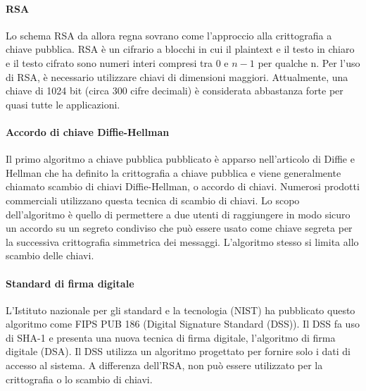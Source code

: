 \paragraph{RSA} Lo schema RSA da allora regna sovrano come l'approccio alla crittografia a chiave pubblica. RSA è un cifrario a blocchi in cui il plaintext e il testo in chiaro e il testo cifrato sono numeri interi compresi tra 0 e $n - 1$ per qualche n. Per l'uso di RSA, è necessario utilizzare chiavi di dimensioni maggiori. Attualmente, una chiave di 1024 bit (circa 300 cifre decimali) è considerata abbastanza forte per quasi tutte le applicazioni.

\singlespacing

\paragraph{Accordo di chiave Diffie-Hellman} Il primo algoritmo a chiave pubblica pubblicato è apparso nell'articolo di Diffie e Hellman che ha definito la crittografia a chiave pubblica e viene generalmente chiamato scambio di chiavi Diffie-Hellman, o accordo di chiavi. Numerosi prodotti commerciali utilizzano questa tecnica di scambio di chiavi. Lo scopo dell'algoritmo è quello di permettere a due utenti di raggiungere in modo sicuro un accordo su un segreto condiviso che può essere usato come chiave segreta per la successiva crittografia simmetrica dei messaggi. L'algoritmo stesso si limita allo scambio delle chiavi.

\singlespacing


\paragraph{Standard di firma digitale} L'Istituto nazionale per gli standard e la tecnologia (NIST) ha pubblicato questo algoritmo come FIPS PUB 186 (Digital Signature Standard (DSS)). Il DSS fa uso di SHA-1 e presenta una nuova tecnica di firma digitale, l'algoritmo di firma digitale (DSA).  Il DSS utilizza un algoritmo progettato per fornire solo i dati di accesso al sistema. A differenza dell'RSA, non può essere utilizzato per la crittografia o lo scambio di chiavi.

\singlespacing

